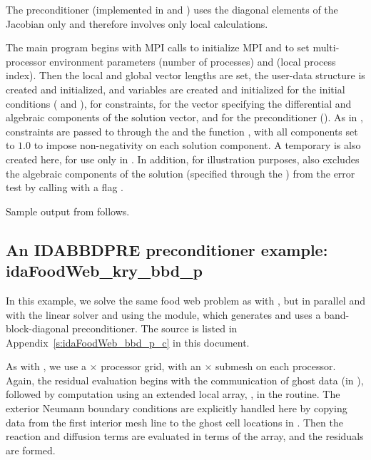The preconditioner (implemented in  and ) uses the
diagonal elements of the Jacobian only and therefore involves only local calculations.

The  main program begins with MPI calls to initialize MPI and to
set multi-processor environment parameters  (number of processes) and
 (local process index).  Then the local and global vector lengths are set,
the user-data structure  is created and initialized, and 
variables are created and initialized for the initial conditions ( and
), for constraints, for the vector  specifying the differential 
and algebraic components of the solution vector, and for the preconditioner
().  As in , constraints are passed to {\ida} through the
  and the function , with
all components set to $1.0$ to impose non-negativity on each solution component.
A temporary   is also created here, for use only in
.  In addition, for illustration purposes,
 also excludes the algebraic components of the solution
(specified through the  ) from the error test by calling
 with a flag .

Sample output from  follows.


\subsection{An IDABBDPRE preconditioner example: idaFoodWeb\_kry\_bbd\_p}\label{ss:idaFoodWeb_bbd_p}

In this example, we solve the same food web problem as with
, but in parallel and with the {\idaspgmr} linear solver and
using the {\idabbdpre} module, which generates and uses a band-block-diagonal 
preconditioner.  The source is listed in Appendix~\ref{s:idaFoodWeb_bbd_p_c}
in this document.

As with , we use a  $\times$  processor grid, with
an  $\times$  submesh on each processor.  Again, the residual
evaluation begins with the communication of ghost data (in ),
followed by computation using an extended local array, , in the
 routine.
The exterior Neumann boundary conditions are explicitly handled here
by copying data from the first interior mesh line to the ghost cell
locations in .  Then the reaction and diffusion terms are
evaluated in terms of the  array, and the residuals are formed.

